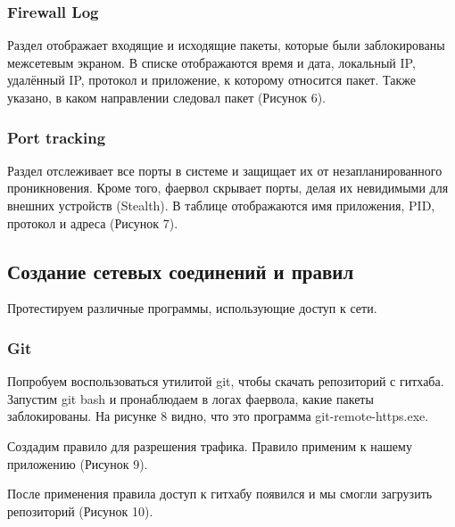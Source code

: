 \FloatBarrier

\subsubsection{Firewall Log}
Раздел отображает входящие и исходящие пакеты, которые были заблокированы межсетевым экраном. В списке отображаются время и дата, локальный IP, удалённый IP, протокол и приложение, к которому относится пакет. Также указано, в каком направлении следовал пакет (Рисунок 6).

\FloatBarrier

\subsubsection{Port tracking}
Раздел отслеживает все порты в системе и защищает их от незапланированного проникновения. Кроме того, фаервол скрывает порты, делая их невидимыми для внешних устройств (Stealth). В таблице отображаются имя приложения, PID, протокол и адреса (Рисунок 7).

\FloatBarrier
\clearpage


\subsection{Создание сетевых соединений и правил}

Протестируем различные программы, использующие доступ к сети.

\subsubsection{Git}

Попробуем воспользоваться утилитой git, чтобы скачать репозиторий с гитхаба. Запустим git bash и пронаблюдаем в логах фаервола, какие пакеты заблокированы. На рисунке 8 видно, что это программа git-remote-https.exe. 


Создадим правило для разрешения трафика. Правило применим к нашему приложению (Рисунок 9). 


После применения правила доступ к гитхабу появился и мы смогли загрузить репозиторий (Рисунок 10).

\FloatBarrier
\clearpage



